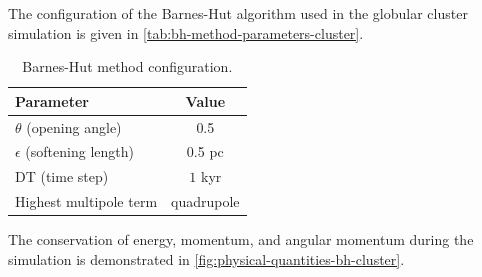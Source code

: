 The configuration of the Barnes-Hut algorithm used in the globular cluster simulation is given in \autoref{tab:bh-method-parameters-cluster}.
\begin{table}[htp]
    \centering
    \begin{tabular}{|l|c|}
        \hline
        \textbf{Parameter}            & \textbf{Value} \\
        \hline
        $\theta$ (opening angle)      & 0.5            \\
        $\epsilon$ (softening length) & 0.5 pc         \\
        DT (time step)                & $1$ kyr        \\
        Highest multipole term        & quadrupole     \\
        \hline
    \end{tabular}
    \caption{Barnes-Hut method configuration.}
    \label{tab:bh-method-parameters-cluster}
\end{table}
The conservation of energy, momentum, and angular momentum during the simulation is demonstrated in \autoref{fig:physical-quantities-bh-cluster}.
